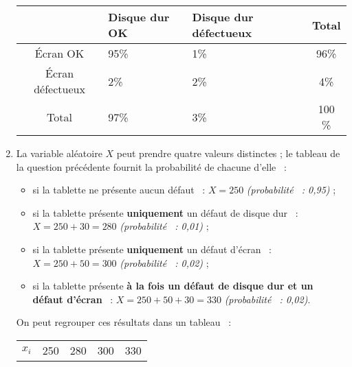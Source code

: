 \begin{corrige}
\begin{enumerate}
\begin{center}
               \begin{tabular}{|c|p{2cm}|p{2cm}|c|}%
                    \hline
                    $\ $ & Disque dur OK & Disque dur défectueux & Total \\
                    \hline
                    \'Ecran OK &  95\% & 1\% & 96\% \\
                    \hline
                    \'Ecran défectueux & 2\% & 2\%  & 4\% \\
                    \hline
                    Total & 97\% & 3\% & 100 \% \\
                    \hline
               \end{tabular}
          \end{center}
          \item %
          \par
          La variable aléatoire $X$ peut prendre quatre valeurs distinctes ; le tableau de la question précédente fournit la probabilité de chacune d'elle ~:
          \par
          \begin{itemize}
               \item si la tablette ne présente aucun défaut ~: ${X=250}$ \textit{(probabilité ~: 0,95)} ;
               \par
               \item si la tablette présente \textbf{uniquement} un défaut de disque dur ~: ${X=250+30=280}$ \textit{(probabilité ~: 0,01)} ;
               \par
               \item si la tablette présente \textbf{uniquement} un défaut d'écran ~:${X=250+50=300}$ \textit{(probabilité ~: 0,02)} ;
               \par
               \item si la tablette présente \textbf{à la fois un défaut de disque dur et un défaut d'écran} ~: ${X=250+50+30=330}$ \textit{(probabilité ~: 0,02)}.
               \par
          \end{itemize}
          \par
          On peut regrouper ces résultats dans un tableau ~:
          \par
          \begin{center}
               \begin{tabular}{|c|c|c|c|c|}%
                    \hline
                    $x_i$ & 250 & 280 & 300 & 330 \\

\end{tabular}
\end{center}
\end{enumerate}
\end{corrige}

